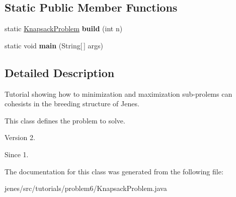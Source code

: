 \subsection*{Static Public Member Functions}
\begin{DoxyCompactItemize}
\item 
\hypertarget{classjenes_1_1tutorials_1_1problem6_1_1_knapsack_problem_aa51d99e0afc8f76e96448bf45d9f412f}{static \hyperlink{classjenes_1_1tutorials_1_1problem6_1_1_knapsack_problem}{Knapsack\-Problem} {\bfseries build} (int n)}\label{classjenes_1_1tutorials_1_1problem6_1_1_knapsack_problem_aa51d99e0afc8f76e96448bf45d9f412f}

\item 
\hypertarget{classjenes_1_1tutorials_1_1problem6_1_1_knapsack_problem_ae706a456c3248ec8360f10138d364c3e}{static void {\bfseries main} (String\mbox{[}$\,$\mbox{]} args)}\label{classjenes_1_1tutorials_1_1problem6_1_1_knapsack_problem_ae706a456c3248ec8360f10138d364c3e}

\end{DoxyCompactItemize}


\subsection{Detailed Description}
Tutorial showing how to minimization and maximization sub-\/prolems can cohesists in the breeding structure of Jenes.

This class defines the problem to solve.

\begin{DoxyVersion}{Version}
2. 
\end{DoxyVersion}
\begin{DoxySince}{Since}
1. 
\end{DoxySince}


The documentation for this class was generated from the following file\-:\begin{DoxyCompactItemize}
\item 
jenes/src/tutorials/problem6/Knapsack\-Problem.\-java\end{DoxyCompactItemize}
